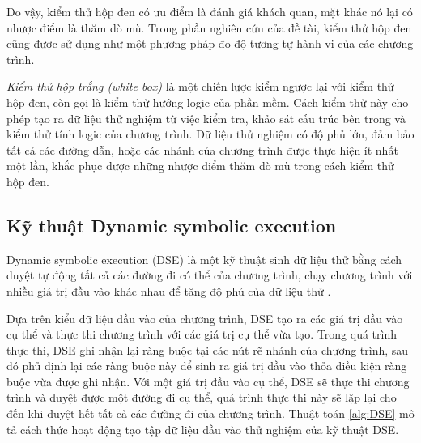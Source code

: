 Do vậy, kiểm thử hộp đen có ưu điểm là đánh giá khách quan, mặt khác
nó lại có nhược điểm là thăm dò mù. Trong phần nghiên cứu của đề tài,
kiểm thử hộp đen cũng được sử dụng như một phương pháp đo độ tương tự
hành vi của các chương trình.
		
\emph{Kiểm thử hộp trắng (white box)} là một chiến lược kiểm ngược lại
với kiểm thử hộp đen, còn gọi là kiểm thử hướng logic của phần
mềm. Cách kiểm thử này cho phép tạo ra dữ liệu thử nghiệm từ việc kiểm
tra, khảo sát cấu trúc bên trong và kiểm thử tính logic của chương
trình. Dữ liệu thử nghiệm có độ phủ lớn, đảm bảo tất cả các đường dẫn,
hoặc các nhánh của chương trình được thực hiện ít nhất một lần, khắc
phục được những nhược điểm thăm dò mù trong cách kiểm thử hộp đen.			

\subsection{Kỹ thuật Dynamic symbolic execution}
\label{sec:dse}

Dynamic symbolic execution (DSE) là một kỹ thuật sinh dữ liệu thử bằng
cách duyệt tự động tất cả các đường đi có thể của chương trình, chạy chương trình với nhiều giá trị đầu vào khác nhau để tăng độ
phủ của dữ liệu thử \cite{xie2009fitness,cadar2013symbolic}.

Dựa trên kiểu dữ liệu đầu vào của chương trình, DSE tạo ra các giá trị đầu vào cụ thể và thực thi chương trình với các giá trị cụ thể vừa tạo. Trong quá trình thực thi, DSE ghi nhận lại ràng buộc tại các nút rẽ nhánh của chương trình, sau đó phủ định lại các ràng buộc này để sinh ra giá trị đầu vào thỏa điều kiện ràng buộc vừa được ghi nhận. Với một giá trị đầu vào cụ thể, DSE sẽ
thực thi chương trình và duyệt được một đường đi cụ thể, quá trình
thực thi này sẽ lặp lại cho đến khi duyệt hết tất cả các đường đi của
chương trình. Thuật toán \ref{alg:DSE} mô tả cách thức hoạt
động tạo tập dữ liệu đầu vào thử nghiệm của kỹ thuật DSE.

